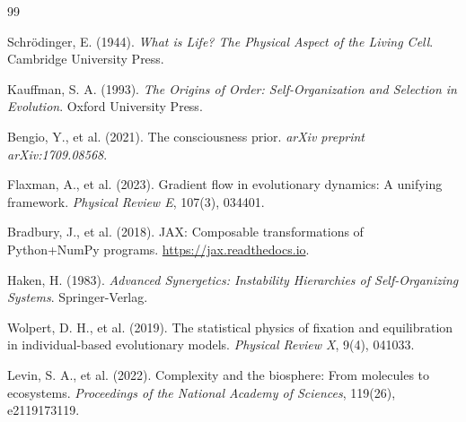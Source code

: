 \documentclass[11pt,a4paper]{article}
\theoremstyle{plain}
\theoremstyle{definition}
\theoremstyle{remark}
\begin{document}
\begin{thebibliography}{99}

Schr\"odinger, E. (1944).
\newblock \textit{What is Life? The Physical Aspect of the Living Cell}.
\newblock Cambridge University Press.

Kauffman, S. A. (1993).
\newblock \textit{The Origins of Order: Self-Organization and Selection in Evolution}.
\newblock Oxford University Press.

Bengio, Y., et al. (2021).
\newblock The consciousness prior.
\newblock \textit{arXiv preprint arXiv:1709.08568}.

Flaxman, A., et al. (2023).
\newblock Gradient flow in evolutionary dynamics: A unifying framework.
\newblock \textit{Physical Review E}, 107(3), 034401.

Bradbury, J., et al. (2018).
\newblock JAX: Composable transformations of Python+NumPy programs.
\newblock \url{https://jax.readthedocs.io}.

Haken, H. (1983).
\newblock \textit{Advanced Synergetics: Instability Hierarchies of Self-Organizing Systems}.
\newblock Springer-Verlag.

Wolpert, D. H., et al. (2019).
\newblock The statistical physics of fixation and equilibration in individual-based evolutionary models.
\newblock \textit{Physical Review X}, 9(4), 041033.

Levin, S. A., et al. (2022).
\newblock Complexity and the biosphere: From molecules to ecosystems.
\newblock \textit{Proceedings of the National Academy of Sciences}, 119(26), e2119173119.

\end{thebibliography}

\end{document}
